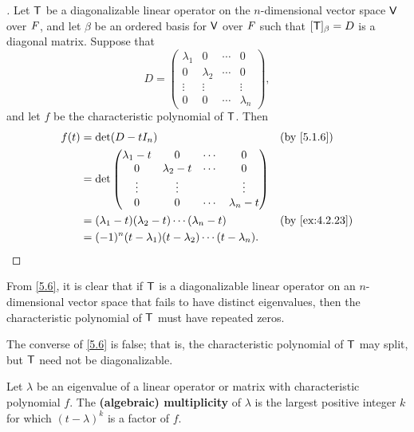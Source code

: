 \begin{proof}[]
	Let \(\mathsf{T}\) be a diagonalizable linear operator on the \(n\)-dimensional vector space \(\mathsf{V}\) over \(\mathit{F}\), and let \(\beta\) be an ordered basis for \(\mathsf{V}\) over \(\mathit{F}\) such that \([\mathsf{T}]_{\beta} = D\) is a diagonal matrix.
	Suppose that
	\[
		D = \begin{pmatrix}
			\lambda_1 & 0         & \cdots & 0         \\
			0         & \lambda_2 & \cdots & 0         \\
			\vdots    & \vdots    &        & \vdots    \\
			0         & 0         & \cdots & \lambda_n
		\end{pmatrix},
	\]
	and let \(f\) be the characteristic polynomial of \(\mathsf{T}\).
	Then
	\begin{align*}
		f(t) & = \det(D - t I_n)                                                &  & \by{5.1.6}     \\
		     & = \det\begin{pmatrix}
			             \lambda_1 - t & 0             & \cdots & 0             \\
			             0             & \lambda_2 - t & \cdots & 0             \\
			             \vdots        & \vdots        &        & \vdots        \\
			             0             & 0             & \cdots & \lambda_n - t
		             \end{pmatrix}                         \\
		     & = (\lambda_1 - t) (\lambda_2 - t) \cdots (\lambda_n - t)         &  & \by{ex:4.2.23} \\
		     & = (-1)^n (t - \lambda_1) (t - \lambda_2) \cdots (t - \lambda_n).
	\end{align*}
\end{proof}

\begin{note}
	From \cref{5.6}, it is clear that if \(\mathsf{T}\) is a diagonalizable linear operator on an \(n\)-dimensional vector space that fails to have distinct eigenvalues, then the characteristic polynomial of \(\mathsf{T}\) must have repeated zeros.

	The converse of \cref{5.6} is false;
	that is, the characteristic polynomial of \(\mathsf{T}\) may split, but \(\mathsf{T}\) need not be diagonalizable.
\end{note}

\begin{defn}\label{5.2.3}
	Let \(\lambda\) be an eigenvalue of a linear operator or matrix with characteristic polynomial \(f\).
	The \textbf{(algebraic) multiplicity} of \(\lambda\) is the largest positive integer \(k\) for which \((t - \lambda)^k\) is a factor of \(f\).
\end{defn}

